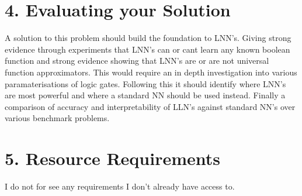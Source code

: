 \documentclass[11pt, a4paper, twoside, openright]{report}
\begin{document}
\section*{4. Evaluating your Solution}

A solution to this problem should build the foundation to LNN's. Giving strong evidence through experiments that LNN's can or cant learn any known boolean function and strong evidence showing that LNN's are or are not universal function approximators. This would require an in depth investigation into various paramaterisations of logic gates. Following this it should identify where LNN's are most powerful and where a standard NN should be used instead. Finally a comparison of accuracy and interpretability of LLN's against standard NN's over various benchmark problems.

\section*{5. Resource Requirements}

I do not for see any requirements I don't already have access to.

\backmatter

%


\end{document}
